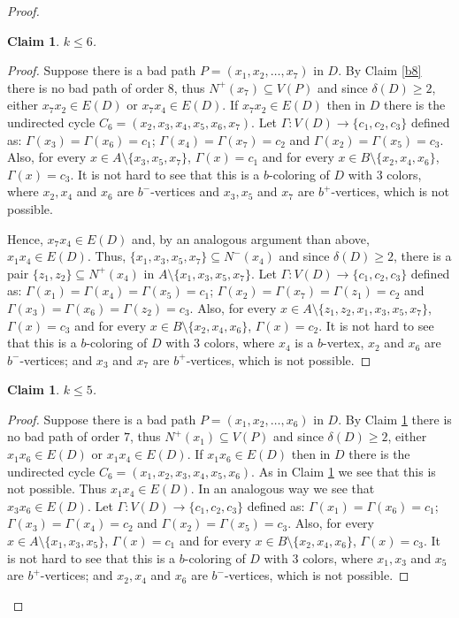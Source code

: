 \documentclass[12pt]{article}
\newtheorem{claim}[theorem]{Claim}
\begin{document}
\begin{proof}
\begin{claim}\label{b7} $k\leq 6$.
\end{claim}
\begin{proof} Suppose there is a bad path $P=(x_1, x_2, \dots, x_7)$ in $D$. By Claim \ref{b8} there is no bad path of order $8$, thus $N^+(x_7) \subseteq V(P)$ and since $\delta(D) \geq 2$,  either $x_7x_2\in E(D)$ or $x_7x_4\in E(D)$. If $x_7x_2\in E(D)$ then in $D$ there is the undirected cycle $C_6= (x_2, x_3, x_4, x_5, x_6, x_7)$.  Let $\Gamma: V(D) \rightarrow \{c_1, c_2, c_3\}$ defined as: $\Gamma(x_3) = \Gamma(x_6) = c_1$; $\Gamma(x_4) = \Gamma(x_7) = c_2$ and $\Gamma(x_2) = \Gamma(x_5) = c_3$. Also, for every $x\in A\setminus\{x_3, x_5, x_7\}$, $\Gamma(x) = c_1$ and for every $x\in B\setminus\{x_2, x_4, x_6\}$, $\Gamma(x) = c_3$. It is not hard to see that this is a $b$-coloring of $D$ with 3 colors, where $x_2, x_4$ and $x_6$ are $b^-$-vertices and $x_3, x_5$ and $x_7$ are $b^+$-vertices, which is not possible. 

Hence, $x_7x_4\in E(D)$ and, by an analogous argument than above, $x_1x_4\in E(D)$. Thus, $\{x_1, x_3, x_5, x_7\}\subseteq N^-(x_4)$ and since $\delta(D) \geq 2$, there is a pair $\{z_1, z_2\}\subseteq N^+(x_4)$ in $A\setminus\{x_1, x_3, x_5, x_7\}$. 
Let $\Gamma: V(D) \rightarrow \{c_1, c_2, c_3\}$ defined as: $\Gamma(x_1) = \Gamma(x_4)= \Gamma(x_5)= c_1$; $\Gamma(x_2) = \Gamma(x_7) =\Gamma(z_1) = c_2$ and $\Gamma(x_3) = \Gamma(x_6) = \Gamma(z_2) = c_3$. Also, for every $x\in A\setminus\{z_1, z_2, x_1, x_3, x_5, x_7\}$, $\Gamma(x) = c_3$ and for every $x\in B\setminus\{x_2, x_4, x_6\}$, $\Gamma(x) = c_2$. It is not hard to see that this is a $b$-coloring of $D$ with 3 colors, where $x_4$ is a $b$-vertex, $x_2$ and  $x_6$ are $b^-$-vertices; and $x_3$ and $x_7$ are $b^+$-vertices, which is not possible. 
\end{proof}


\begin{claim}\label{b6} $k\leq 5$.
\end{claim}
\begin{proof} Suppose there is a bad path $P=(x_1, x_2, \dots, x_6)$ in $D$. By Claim \ref{b7} there is no bad path of order $7$, thus $N^+(x_1) \subseteq V(P)$ and since $\delta(D) \geq 2$,  either $x_1x_6\in E(D)$ or $x_1x_4\in E(D)$. If $x_1x_6\in E(D)$ then in $D$ there is the undirected cycle $C_6= (x_1, x_2, x_3, x_4, x_5, x_6)$. As in Claim \ref{b7} we see that this is not possible. Thus  $x_1x_4\in E(D)$. In an analogous way we see that $x_3x_6\in E(D)$.  Let $\Gamma: V(D) \rightarrow \{c_1, c_2, c_3\}$ defined as: $\Gamma(x_1) = \Gamma(x_6) = c_1$; $\Gamma(x_3) = \Gamma(x_4) = c_2$ and $\Gamma(x_2) = \Gamma(x_5) = c_3$. Also, for every $x\in A\setminus\{x_1, x_3, x_5\}$, $\Gamma(x) = c_1$ and for every $x\in B\setminus\{x_2, x_4, x_6\}$, $\Gamma(x) = c_3$. It is not hard to see that this is a $b$-coloring of $D$ with 3 colors, where $x_1, x_3$ and $x_5$ are $b^+$-vertices; and $x_2, x_4$ and $x_6$ are $b^-$-vertices, which is not possible. 
\end{proof}


\end{proof}
\end{document}
